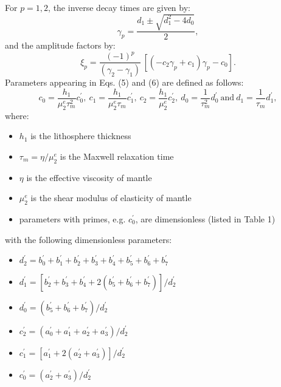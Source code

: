 For $p = 1,2$, the inverse decay times are given by:
\begin{equation}
	\gamma_p = \frac{d_1 \pm \sqrt{d_1^2 - 4 d_0} }{2},
\end{equation}
and the amplitude factors by:
\begin{equation}
	\xi_p = \frac{\left( -1 \right)^p}{\left(\gamma_2 - \gamma_1\right)} \, \left[ \left(- c_2 \gamma_p + c_1\right) \gamma_p  -c_0 \right].
\end{equation}
Parameters appearing in Eqs. (5) and (6) are defined as follows:
\begin{equation}
	c_0 = \frac{h_1}{\mu_2^e \tau_{m}^2} c_0^{\prime}, ~ c_1 = \frac{h_1}{\mu_2^e \tau_{m}} c_1^{\prime}, ~ c_2 = \frac{h_1}{\mu_2^e} c_2^{\prime}, ~ d_0 = \frac{1}{\tau_{m}^2} d_0^{\prime} ~ \text{and} ~ d_1 = \frac{1}{\tau_{m}} d_1^{\prime},
\end{equation}
where:
\begin{itemize}
	\item $h_1$ is the lithosphere thickness
	\item $\tau_m = \eta/\mu_2^e$ is the Maxwell relaxation time
	\item $\eta$ is the effective viscosity of mantle
	\item $\mu_2^e$ is the shear modulus of elasticity of mantle
	\item parameters with primes, e.g. $c_0^{\prime}$, are dimensionless (listed in Table 1)
\end{itemize}
with the following dimensionless parameters:
\begin{itemize}
	\item $d_2^{\prime} = b_0^{\prime} + b_1^{\prime} + b_2^{\prime} + b_3^{\prime} + b_4^{\prime} + b_5^{\prime} + b_6^{\prime} + b_7^{\prime}$
	\item $d_1^{\prime} = \left[ b_2^{\prime} + b_3^{\prime} + b_4^{\prime} + 2 \left( b_5^{\prime} + b_6^{\prime} + b_7^{\prime} \right) \right] / d_2^{\prime}$
	\item $d_0^{\prime} = \left( b_5^{\prime} + b_6^{\prime} + b_7^{\prime} \right) / d_2^{\prime}$
	\item $c_2^{\prime} = \left( a_0^{\prime} + a_1^{\prime} + a_2^{\prime} + a_3^{\prime} \right) / d_2^{\prime}$
	\item $c_1^{\prime} = \left[ a_1^{\prime} + 2 \left( a_2^{\prime} + a_3^{\prime} \right) \right] / d_2^{\prime}$
	\item $c_0^{\prime} = \left( a_2^{\prime} + a_3^{\prime} \right) / d_2^{\prime}$
\end{itemize}
